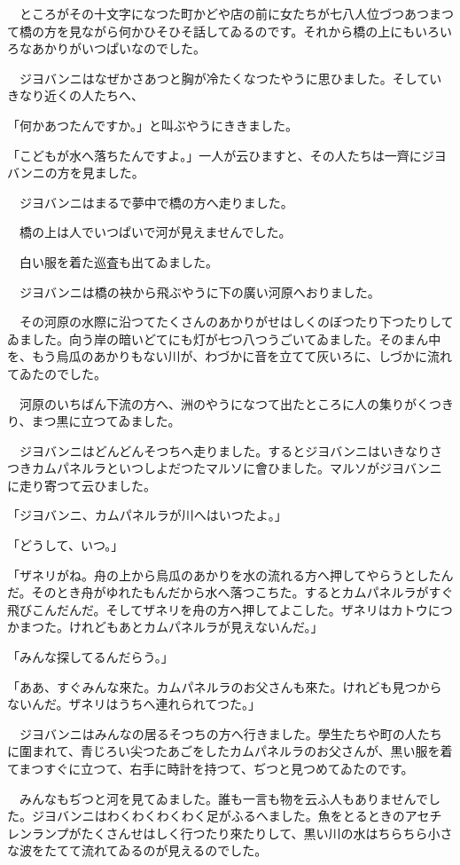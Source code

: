 \documentclass[tate,paper=b6j,jafontsize=9pt]{jlreq}
\begin{document}
　ところがその十文字になつた町かどや店の前に女たちが七八人位づつあつまつて橋の方を見ながら何かひそひそ話してゐるのです。それから橋の上にもいろいろなあかりがいつぱいなのでした。

　ジヨバンニはなぜかさあつと胸が冷たくなつたやうに思ひました。そしていきなり近くの人たちへ、

「何かあつたんですか。」と叫ぶやうにききました。

「こどもが水へ落ちたんですよ。」一人が云ひますと、その人たちは一齊にジヨバンニの方を見ました。

　ジヨバンニはまるで夢中で橋の方へ走りました。

　橋の上は人でいつぱいで河が見えませんでした。

　白い服を着た巡査も出てゐました。

　ジヨバンニは橋の袂から飛ぶやうに下の廣い河原へおりました。

　その河原の水際に沿つてたくさんのあかりがせはしくのぼつたり下つたりしてゐました。向う岸の暗いどてにも灯が七つ八つうごいてゐました。そのまん中を、もう烏瓜のあかりもない川が、わづかに音を立てて灰いろに、しづかに流れてゐたのでした。

　河原のいちばん下流の方へ、洲のやうになつて出たところに人の集りがくつきり、まつ黒に立つてゐました。

　ジヨバンニはどんどんそつちへ走りました。するとジヨバンニはいきなりさつきカムパネルラといつしよだつたマルソに會ひました。マルソがジヨバンニに走り寄つて云ひました。

「ジヨバンニ、カムパネルラが川へはいつたよ。」

「どうして、いつ。」

「ザネリがね。舟の上から烏瓜のあかりを水の流れる方へ押してやらうとしたんだ。そのとき舟がゆれたもんだから水へ落つこちた。するとカムパネルラがすぐ飛びこんだんだ。そしてザネリを舟の方へ押してよこした。ザネリはカトウにつかまつた。けれどもあとカムパネルラが見えないんだ。」

「みんな探してるんだらう。」

「ああ、すぐみんな來た。カムパネルラのお父さんも來た。けれども見つからないんだ。ザネリはうちへ連れられてつた。」

　ジヨバンニはみんなの居るそつちの方へ行きました。學生たちや町の人たちに圍まれて、青じろい尖つたあごをしたカムパネルラのお父さんが、黒い服を着てまつすぐに立つて、右手に時計を持つて、ぢつと見つめてゐたのです。

　みんなもぢつと河を見てゐました。誰も一言も物を云ふ人もありませんでした。ジヨバンニはわくわくわくわく足がふるへました。魚をとるときのアセチレンランプがたくさんせはしく行つたり來たりして、黒い川の水はちらちら小さな波をたてて流れてゐるのが見えるのでした。
\end{document}
